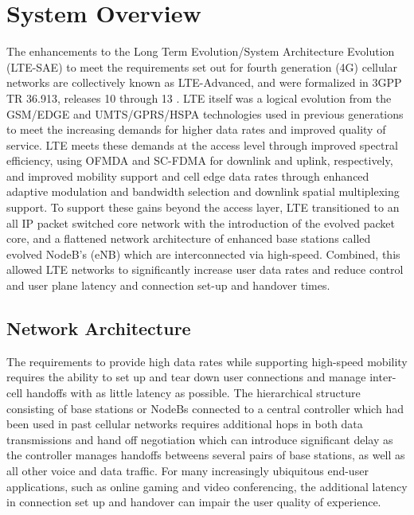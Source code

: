 \section{System Overview}
\label{sys-overview}
The enhancements to the Long Term Evolution/System Architecture Evolution (LTE-SAE) to meet the requirements set out for fourth generation (4G) cellular networks are collectively known as LTE-Advanced, and were formalized in 3GPP TR 36.913, releases 10 through 13 \cite{tr36913}.  LTE itself was a logical evolution from the GSM/EDGE and UMTS/GPRS/HSPA technologies used in previous generations to meet the increasing demands for higher data rates and improved quality of service. LTE meets these demands at the access level through improved spectral efficiency, using OFMDA and SC-FDMA for downlink and uplink, respectively, and improved mobility support and cell edge data rates through enhanced adaptive modulation and bandwidth selection and downlink spatial multiplexing support. To support these gains beyond the access layer, LTE transitioned to an all IP packet switched core network with the introduction of the evolved packet core, and a flattened network architecture of enhanced base stations called evolved NodeB's (eNB) which are interconnected via high-speed.  Combined, this allowed LTE networks to significantly increase user data rates and reduce control and user plane latency and connection set-up and handover times.  

\subsection{Network Architecture}
\label{net-arch}
The requirements to provide high data rates while supporting high-speed mobility requires the ability to set up and tear down user connections and manage inter-cell handoffs with as little latency as possible.  The hierarchical structure consisting of base stations or NodeBs connected to a central controller which had been used in past cellular networks requires additional hops in both data transmissions and hand off negotiation which can introduce significant delay as the controller manages handoffs betweens several pairs of base stations, as well as all other voice and data traffic.  For many increasingly ubiquitous end-user applications, such as online gaming and video conferencing, the additional latency in connection set up and handover can impair the user quality of experience.  

